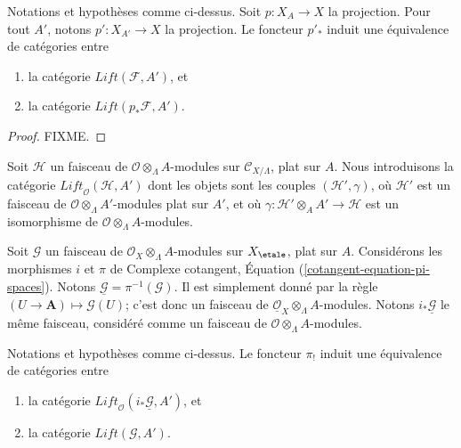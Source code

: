 \begin{lemma}
\label{lemma-equivalence}
Notations et hypoth\`eses comme ci-dessus. Soit $p : X_A \to X$ la projection.
Pour tout $A'$, notons $p' : X_{A'} \to X$ la projection. Le foncteur $p'_*$
induit une \'equivalence de cat\'egories entre
\begin{enumerate}
\item la cat\'egorie $\textit{Lift}(\mathcal{F}, A')$, et
\item la cat\'egorie $\textit{Lift}(p_*\mathcal{F}, A')$.
\end{enumerate}
\end{lemma}

\begin{proof}
FIXME.
\end{proof}

\noindent
Soit $\mathcal{H}$ un faisceau de $\mathcal{O} \otimes_\Lambda A$-modules
sur $\mathcal{C}_{X/\Lambda}$, plat sur $A$. Nous introduisons la cat\'egorie
$\textit{Lift}_\mathcal{O}(\mathcal{H}, A')$
dont les objets sont les couples $(\mathcal{H}', \gamma)$, o\`u $\mathcal{H}'$
est un faisceau de $\mathcal{O} \otimes_\Lambda A'$-modules plat sur $A'$,
et o\`u $\gamma : \mathcal{H}' \otimes_A A' \to \mathcal{H}$
est un isomorphisme de $\mathcal{O} \otimes_\Lambda A$-modules.

\medskip\noindent
Soit $\mathcal{G}$ un faisceau de $\mathcal{O}_X \otimes_\Lambda A$-modules
sur $X_\etale$, plat sur $A$.
Consid\'erons les morphismes $i$ et $\pi$ de
Complexe cotangent, \'Equation (\ref{cotangent-equation-pi-spaces}).
Notons $\underline{\mathcal{G}} = \pi^{-1}(\mathcal{G})$. Il est
simplement donn\'e par la r\`egle $(U \to \mathbf{A}) \mapsto \mathcal{G}(U)$;
c'est donc un faisceau de
$\underline{\mathcal{O}}_X \otimes_\Lambda A$-modules.
Notons $i_*\underline{\mathcal{G}}$ le m\^eme faisceau, consid\'er\'e comme un
faisceau de $\mathcal{O} \otimes_\Lambda A$-modules.

\begin{lemma}
\label{lemma-second-equivalence}
Notations et hypoth\`eses comme ci-dessus.
Le foncteur $\pi_!$ induit une \'equivalence de cat\'egories entre
\begin{enumerate}
\item la cat\'egorie
$\textit{Lift}_\mathcal{O}(i_*\underline{\mathcal{G}}, A')$, et
\item la cat\'egorie $\textit{Lift}(\mathcal{G}, A')$.
\end{enumerate}
\end{lemma}


